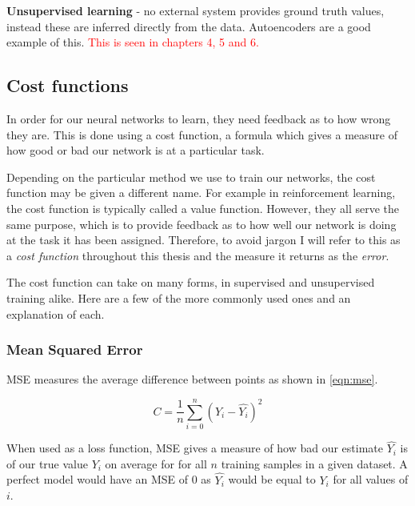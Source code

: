 \textbf{Unsupervised learning} - no external system provides ground truth values, instead these are inferred directly from the data. Autoencoders are a good example of this.  \textcolor{red}{This is seen in chapters 4, 5 and 6.}




\subsection{Cost functions}
In order for our neural networks to learn, they need feedback as to how wrong they are. This is done using a cost function, a formula which gives a measure of how good or bad our network is at a particular task.

Depending on the particular method we use to train our networks, the cost function may be given a different name. For example in reinforcement learning, the cost function is typically called a value function. However, they all serve the same purpose, which is to provide feedback as to how well our network is doing at the task it has been assigned. Therefore, to avoid jargon I will refer to this as a \textit{cost function} throughout this thesis and the measure it returns as the \textit{error}.

The cost function can take on many forms, in supervised and unsupervised training alike. Here are a few of the more commonly used ones and an explanation of each.

\subsubsection{Mean Squared Error}
\ac{MSE} measures the average difference between points as shown in \autoref{eqn:mse}.

\begin{equation} \label{eqn:mse}
C = \frac{1}{n}\sum_{i=0}^{n} (Y_i - \hat{Y_i})^2
\end{equation}

When used as a loss function, \ac{MSE} gives a measure of how bad our estimate $\hat{Y_i}$ is of our true value $Y_i$ on average for for all $n$ training samples in a given dataset. A perfect model would have an \ac{MSE} of 0 as $\hat{Y_i}$ would be equal to $Y_i$ for all values of $i$.

